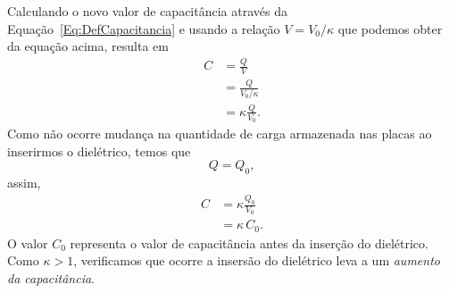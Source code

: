 Calculando o novo valor de capacitância através da Equação~\eqref{Eq:DefCapacitancia} e usando a relação $V = V_0 / \kappa$ que podemos obter da equação acima, resulta em
\begin{align}
    C &= \frac{Q}{V} \\
    &= \frac{Q}{V_0 / \kappa} \\
    &=\kappa \frac{Q}{V_0}.
\end{align}
%
Como não ocorre mudança na quantidade de carga armazenada nas placas ao inserirmos o dielétrico, temos que
\begin{equation}
    Q = Q_0,
\end{equation}
%
assim,
\begin{align}
    C &= \kappa \frac{Q_0}{V_0} \\
    &= \kappa \, C_0.
\end{align}
%
O valor $C_0$ representa o valor de capacitância antes da inserção do dielétrico. Como $\kappa > 1$, verificamos que ocorre a insersão do dielétrico leva a um \emph{aumento da capacitância}.

